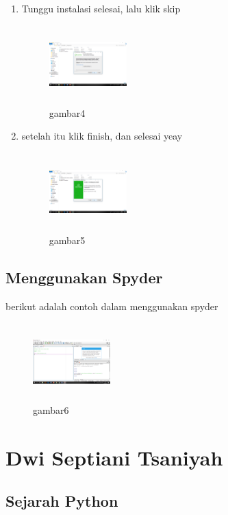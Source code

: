 \begin{enumerate}
    \item Tunggu instalasi selesai, lalu klik skip
    \begin{figure}[!htbp]
        \centering
        \includegraphics[width=3cm,height=3cm]{figures/4.png}
        \caption{gambar4}
        \label{skip}
        \end{figure}

    \item setelah itu klik finish, dan selesai yeay
    \begin{figure}[!htbp]
        \centering
        \includegraphics[width=3cm,height=3cm]{figures/5.png}
        \caption{gambar5}
        \label{selesai}
        \end{figure}
\end{enumerate}

\subsection{Menggunakan Spyder}
berikut adalah contoh dalam menggunakan spyder
\begin{figure}[!htbp]
    \centering
    \includegraphics[width=3cm,height=3cm]{figures/6.png}
    \caption{gambar6}
    \label{spyder}
    \end{figure}
\section{Dwi Septiani Tsaniyah}
\subsection{Sejarah Python}

